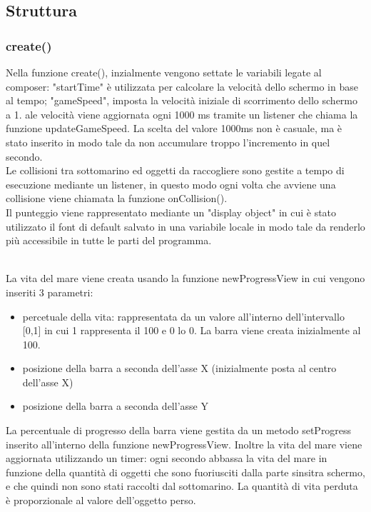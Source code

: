 \documentclass[15pt]{article}
\begin{document}
\subsection{Struttura}
\subsubsection{create()}
Nella funzione create(), inzialmente vengono settate le variabili legate al composer: "startTime" è utilizzata per calcolare la 
velocità dello schermo in base al tempo; "gameSpeed", imposta la velocità iniziale di scorrimento dello schermo a 1. 
ale velocità viene aggiornata ogni 1000 ms tramite un listener che chiama la funzione updateGameSpeed. 
La scelta del valore 1000ms non è casuale, ma è stato inserito in modo tale da non accumulare troppo l'incremento in quel secondo.
\\

Le collisioni tra sottomarino ed oggetti da raccogliere sono gestite a tempo di esecuzione mediante un listener, in questo modo ogni volta che avviene una collisione viene chiamata la funzione onCollision(). 
\\

Il punteggio viene rappresentato mediante un "display object" in cui è stato utilizzato il font di default salvato in una variabile locale in modo tale da renderlo più accessibile in tutte le parti del programma. 

\\
La vita del mare viene creata usando la funzione newProgressView in cui vengono inseriti 3 parametri:
\begin{itemize}
    \item percetuale della vita: rappresentata da un valore all'interno dell'intervallo [0,1] in cui 1 rappresenta il 100 e 0 lo 0. La barra viene creata inizialmente al 100.
    \item posizione della barra a seconda dell'asse X (inizialmente posta al centro dell'asse X)
    \item posizione della barra a seconda dell'asse Y
\end{itemize}
La percentuale di progresso della barra viene gestita da un metodo setProgress inserito all'interno della funzione newProgressView. Inoltre la vita del mare viene aggiornata utilizzando un timer: ogni secondo abbassa la vita del mare in funzione della quantità di oggetti che sono fuoriusciti dalla parte sinsitra schermo, e che quindi non sono stati raccolti dal sottomarino. La quantità di vita perduta è proporzionale al valore dell'oggetto perso.
\end{document}
